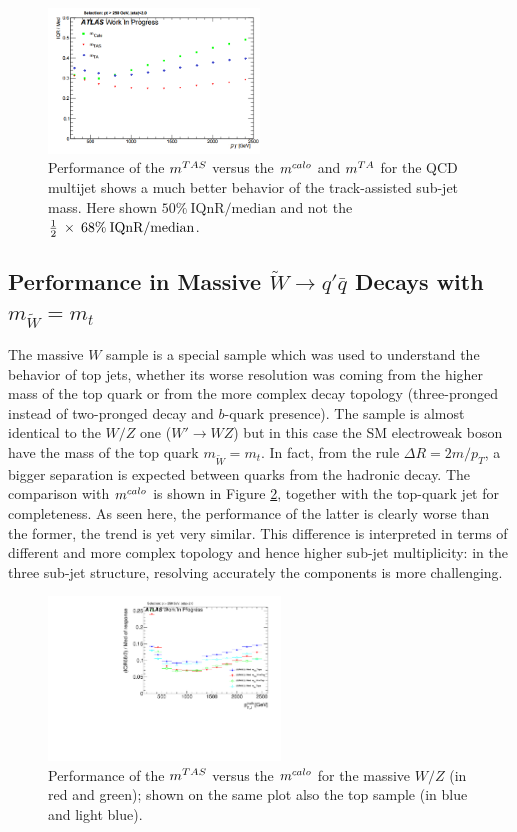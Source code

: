 \begin{figure}[!ht]
  \centering
        \includegraphics[width=0.50\textwidth]{jet_part/mtas/qcdmtastruffa.png}
   \caption[$\mtas$ for QCD jets]{Performance of the $\mtas$ versus the $m^{calo}$ and $m^{TA}$ for the QCD multijet shows a much better behavior of the track-assisted sub-jet mass. Here shown $50\% \:\textrm{IQnR/median}$ and not the $\frac{1}{2}\: \times\: 68\% \:\textrm{IQnR/median}$.}
  \label{fig:mtas5}
\end{figure}

\subsection{Performance in Massive $\tilde{W}\to q'\bar{q}$ Decays with $m_{\tilde{W}}=m_t$}
The massive $W$ sample is a special sample which was used to understand the behavior of top jets, whether its worse resolution was coming from the higher mass of the top quark or from the more complex decay topology (three-pronged instead of two-pronged decay and $b$-quark presence). 
The sample is almost identical to the $W/Z$ one ($W'\to WZ$) but in this case the SM electroweak boson have the mass of the top quark $m_{\tilde{W}}=m_t$.
In fact, from the rule $\Delta R=2m/p_T$, a bigger separation is expected between quarks from the hadronic decay.
The comparison with $m^{calo}$ is shown in Figure \ref{fig:mtas6}, together with the top-quark jet for completeness. As seen here, the performance of the latter is clearly worse than the former, the trend is yet very similar. This difference is interpreted in terms of different and more complex topology and hence higher sub-jet multiplicity: in the three sub-jet structure, resolving accurately the components is more challenging.

\begin{figure}[!ht]
  \centering
     \includegraphics[width=0.55\textwidth]{jet_part/mtas/71graphcftr_h_JetRatio_mJ12CALOIQRoMcalib_WmassiveVsTops.pdf}
   \caption[$\mtas$ for massive $W/Z$]{Performance of the $\mtas$ versus the $m^{calo}$ for the massive $W/Z$ (in red and green); shown on the same plot also the top sample (in blue and light blue).}
  \label{fig:mtas6}
\end{figure}

